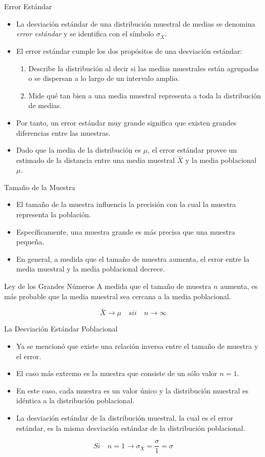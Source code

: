 \documentclass{beamer}
\begin{document}
\begin{frame}{Error Estándar}
\begin{itemize}
\justifying
\item La desviación estándar de una distribución muestral de medias se denomina \emph{error estándar} y se identifica con el símbolo $\sigma_{\bar{X}}$.
\item El error estándar cumple los dos propósitos de una desviación estándar:
\begin{enumerate}
\item Describe la distribución al decir si las medias muestrales están agrupadas o se dispersan a lo largo de un intervalo amplio.
\item Mide qué tan bien a una media muestral representa a toda la distribución de medias.
\end{enumerate}
\item Por tanto, un error estándar muy grande significa que existen grandes diferencias entre las muestras.
\item Dado que la media de la distribución es $\mu$, el error estándar provee un estimado de la distancia entre una media muestral $\bar{X}$ y la media poblacional $\mu$.
\end{itemize}
\end{frame}

\begin{frame}{Tamaño de la Muestra}
\begin{itemize}
\justifying
\item El tamaño de la muestra influencia la precisión con la cual la muestra representa la población.
\item Específicamente, una muestra grande es más precisa que una muestra pequeña.
\item En general, a medida que el tamaño de muestra aumenta, el error entre la media muestral y la media poblacional decrece.
\end{itemize}
\begin{block}{Ley de los Grandes Números}
A medida que el tamaño de muestra $n$ aumenta, es más probable que la media muestral sea cercana a la media poblacional.
\end{block}
$$\bar{X}\rightarrow \mu \quad sii \quad n\rightarrow \infty$$
\end{frame}

\begin{frame}{La Desviación Estándar Poblacional}
\begin{itemize}
\justifying
\item Ya se mencionó que existe una relación inversa entre el tamaño de muestra y el error.
\item El caso más extremo es la muestra que consiste de un sólo valor $n=1$.
\item En este caso, cada muestra es un valor único y la distribución muestral es idéntica a la distribución poblacional.
\item La desviación estándar de la distribución muestral, la cual es el error estándar, es la misma desviación estándar de la distribución poblacional.
\end{itemize}
$$Si \quad n=1 \rightarrow \sigma_{\bar{X}}=\dfrac{\sigma}{1}=\sigma$$
\end{frame}
\end{document}
